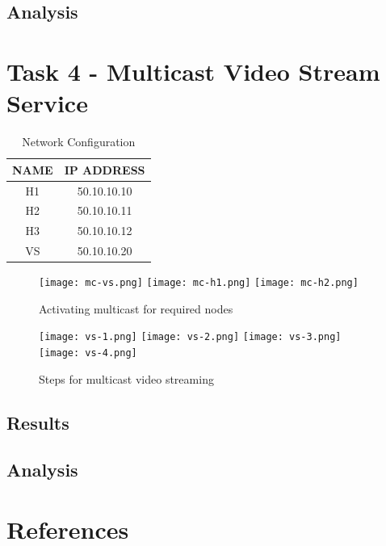 \documentclass{article}
\begin{document}
    \subsection{Analysis}

\newpage
\section{Task 4 - Multicast Video Stream Service}
    \begin{table}[h]
        \centering
        \begin{tabular}{|c|c|}
            \hline
            NAME & IP ADDRESS \\
            \hline
            H1 & 50.10.10.10 \\
            H2 & 50.10.10.11 \\
            H3 & 50.10.10.12 \\
            VS & 50.10.10.20 \\
            \hline
        \end{tabular}
        \caption{Network Configuration}
        \label{tab:node-info}
    \end{table}
    \begin{figure}[h]
        \centering
        \texttt{[image: mc-vs.png]}
        \texttt{[image: mc-h1.png]}
        \texttt{[image: mc-h2.png]}
        \caption{Activating multicast for required nodes}
        \label{fig:activate multicast}
    \end{figure}
    \begin{figure}[h]
        \texttt{[image: vs-1.png]}
        \texttt{[image: vs-2.png]}
        \texttt{[image: vs-3.png]}
        \texttt{[image: vs-4.png]}
        \caption{Steps for multicast video streaming}
        \label{fig:enter-label}
    \end{figure}
    \newpage
    
    \subsection{Results}
    \subsection{Analysis}

\newpage
\section{References}


\end{document}
